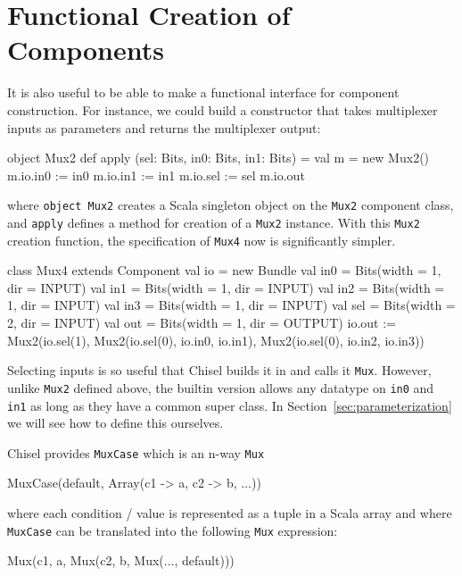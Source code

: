 \documentclass[twocolumn,10pt]{article}
\def\code#1{{\tt #1}}
\begin{document}
\section{Functional Creation of Components}
\label{sec:funconstructor}

It is also useful to be able to make a functional interface for
component construction.  For instance, we could build a constructor
that takes multiplexer inputs as parameters and returns the
multiplexer output:

\begin{scala}
object Mux2 {
  def apply (sel: Bits, in0: Bits, in1: Bits) = {
    val m = new Mux2()
    m.io.in0 := in0
    m.io.in1 := in1
    m.io.sel := sel
    m.io.out
  }
}
\end{scala}

\noindent
where \code{object Mux2} creates a Scala singleton object on the \code{Mux2}
component class, and \code{apply} defines a method for creation of a \code{Mux2} instance.
%
With this \code{Mux2} creation function, the specification of \code{Mux4} now is
significantly simpler.

\begin{scala}
class Mux4 extends Component {
  val io = new Bundle {
    val in0 = Bits(width = 1, dir = INPUT)
    val in1 = Bits(width = 1, dir = INPUT)
    val in2 = Bits(width = 1, dir = INPUT)
    val in3 = Bits(width = 1, dir = INPUT)
    val sel = Bits(width = 2, dir = INPUT)
    val out = Bits(width = 1, dir = OUTPUT)
  }
  io.out := Mux2(io.sel(1),
                 Mux2(io.sel(0), io.in0, io.in1),
                 Mux2(io.sel(0), io.in2, io.in3))
}
\end{scala}

Selecting inputs is so useful that Chisel builds it in and calls it
\code{Mux}.  However, unlike \code{Mux2} defined above, the builtin version allows any datatype on
\code{in0} and \code{in1} as long as they have a common super class.
In Section~\ref{sec:parameterization} we will see how to define this
ourselves.

Chisel provides \code{MuxCase} which is an n-way \code{Mux} 
\begin{scala}
MuxCase(default, Array(c1 -> a, c2 -> b, ...))
\end{scala}
 
\noindent
where each condition / value is represented as a tuple in a Scala
array and where \code{MuxCase} can be translated into the following
\code{Mux} expression:

\begin{scala}
Mux(c1, a, Mux(c2, b, Mux(..., default)))
\end{scala}
\end{document}
